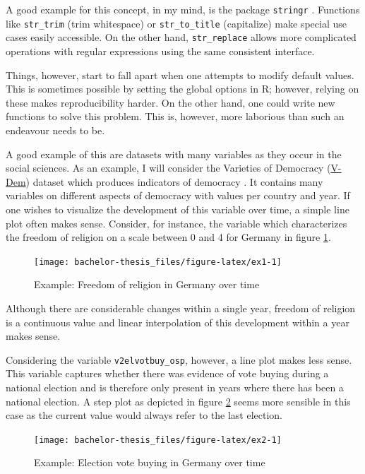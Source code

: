 \documentclass[]{report}
\theoremstyle{definition}
\theoremstyle{definition}
\theoremstyle{definition}
\theoremstyle{remark}
\begin{document}
A good example for this concept, in my mind, is the package
\texttt{stringr} \citep{stringr}. Functions like \texttt{str\_trim}
(trim whitespace) or \texttt{str\_to\_title} (capitalize) make special
use cases easily accessible. On the other hand, \texttt{str\_replace}
allows more complicated operations with regular expressions using the
same consistent interface.

Things, however, start to fall apart when one attempts to modify default
values. This is sometimes possible by setting the global options in R;
however, relying on these makes reproducibility harder. On the other
hand, one could write new functions to solve this problem. This is,
however, more laborious than such an endeavour needs to be.

A good example of this are datasets with many variables as they occur in
the social sciences. As an example, I will consider the Varieties of
Democracy (\href{v-dem.net}{V-Dem}) dataset which produces indicators of
democracy \citep[\citet{Pemstein2018}]{vdem2018}. It contains many
variables on different aspects of democracy with values per country and
year. If one wishes to visualize the development of this variable over
time, a simple line plot often makes sense. Consider, for instance, the
variable which characterizes the freedom of religion on a scale between
0 and 4 for Germany in figure \ref{fig:ex1}.

\begin{figure}

{\centering \texttt{[image: bachelor-thesis\_files/figure-latex/ex1-1]} 

}

\caption{Example: Freedom of religion in Germany over time}\label{fig:ex1}
\end{figure}

Although there are considerable changes within a single year, freedom of
religion is a continuous value and linear interpolation of this
development within a year makes sense.

Considering the variable \texttt{v2elvotbuy\_osp}, however, a line plot
makes less sense. This variable captures whether there was evidence of
vote buying during a national election and is therefore only present in
years where there has been a national election. A step plot as depicted
in figure \ref{fig:ex2} seems more sensible in this case as the current
value would always refer to the last election.

\begin{figure}

{\centering \texttt{[image: bachelor-thesis\_files/figure-latex/ex2-1]} 

}

\caption{Example: Election vote buying in Germany over time}\label{fig:ex2}
\end{figure}
\end{document}
